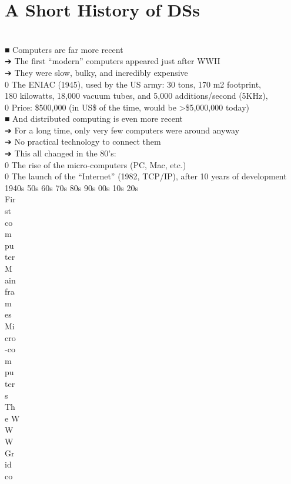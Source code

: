 \documentclass[12pt]{article}
\begin{document}
\section{A Short History of DSs}
\\
■ Computers are far more recent\\
➔ The first “modern” computers appeared just after WWII\\
➔ They were slow, bulky, and incredibly expensive\\
0 The ENIAC (1945), used by the US army: 30 tons, 170 m2 footprint,\\
180 kilowatts, 18,000 vacuum tubes, and 5,000 additions/second (5KHz),\\
0 Price: \$500,000 (in US\$ of the time, would be  \textgreater  \$5,000,000 today)\\
■ And distributed computing is even more recent\\
➔ For a long time, only very few computers were around anyway\\
➔ No practical technology to connect them\\
➔ This all changed in the 80’s:\\
0 The rise of the micro-computers (PC, Mac, etc.)\\
0 The launch of the “Internet” (1982, TCP/IP), after 10 years of development\\
1940s 50s 60s 70s 80s 90s 00s 10s 20s\\
Fir\\
st\\
co\\
m\\
pu\\
ter\\
M\\
ain\\
fra\\
m\\
es\\
Mi\\
cro\\
-co\\
m\\
pu\\
ter\\
s\\
Th\\
e W\\
W\\
W\\
Gr\\
id\\
co\\
\end{document}
